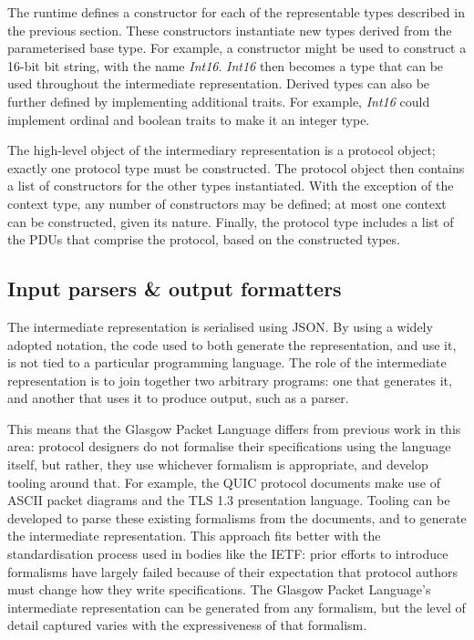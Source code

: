 \documentclass[10pt,sigconf]{acmart}
\begin{document}
The runtime defines a constructor for each of the representable types described in the
previous section. These constructors instantiate new types derived from the parameterised
base type. For example, a constructor might be used to construct a 16-bit bit string, with
the name \emph{Int16}. \emph{Int16} then becomes a type that can be used throughout the
intermediate representation. Derived types can also be further defined by implementing
additional traits. For example, \emph{Int16} could implement ordinal and boolean traits to
make it an integer type.

The high-level object of the intermediary representation is a protocol object; exactly
one protocol type must be constructed. The protocol object then contains a list of
constructors for the other types instantiated. With the exception of the context type,
any number of constructors may be defined; at most one context can be constructed, given
its nature. Finally, the protocol type includes a list of the PDUs that comprise the
protocol, based on the constructed types.

\subsection{Input parsers \& output formatters}
\label{sec:gpl-formats}

The intermediate representation is serialised using JSON. By using a widely adopted
notation, the code used to both generate the representation, and use it, is not tied to a
particular programming language. The role of the intermediate representation is to join
together two arbitrary programs: one that generates it, and another that uses it to
produce output, such as a parser.

This means that the Glasgow Packet Language differs from previous work in this area:
protocol designers do not formalise their specifications using the language itself, but
rather, they use whichever formalism is appropriate, and develop tooling around that. For
example, the QUIC protocol documents make use of ASCII packet diagrams and the TLS 1.3
presentation language. Tooling can be developed to parse these existing formalisms from
the documents, and to generate the intermediate representation. This approach fits better
with the standardisation process used in bodies like the IETF: prior efforts to introduce
formalisms have largely failed because of their expectation that protocol authors must
change how they write specifications. The Glasgow Packet Language's intermediate
representation can be generated from any formalism, but the level of detail captured
varies with the expressiveness of that formalism.
\end{document}
